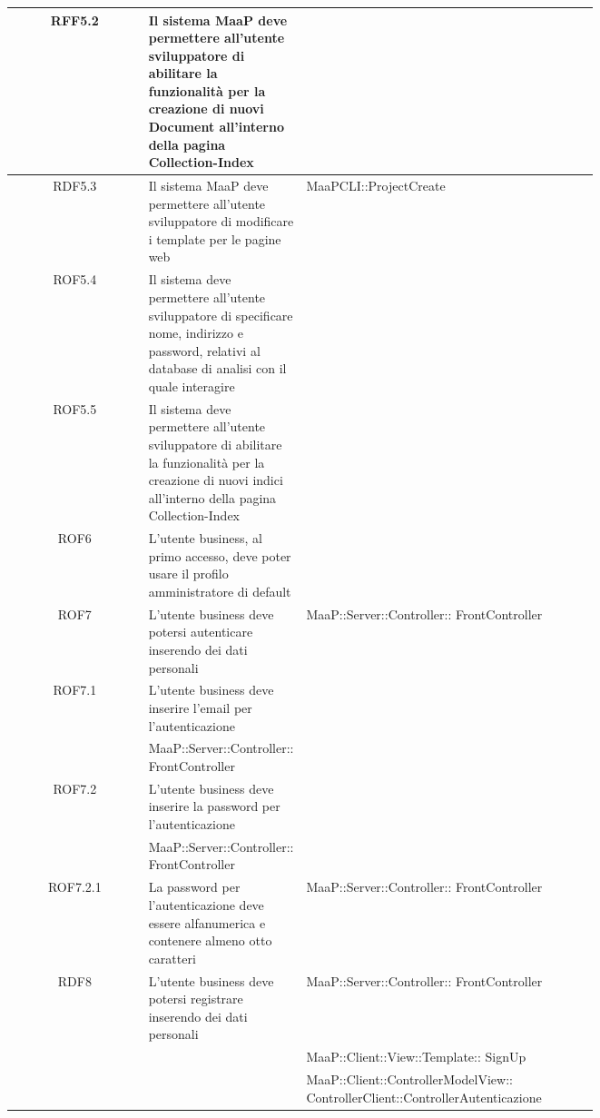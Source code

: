 \begin{center}
\begin{longtable}{|c|p{0.25\linewidth}|p{0.5\linewidth}|}
\midrule
RFF5.2
& Il sistema MaaP deve permettere all'utente sviluppatore di abilitare la funzionalità per la creazione di nuovi Document all'interno della pagina Collection-Index
& \\

\midrule
RDF5.3
& Il sistema MaaP deve permettere all'utente sviluppatore di modificare i template per le pagine web
& MaaPCLI::ProjectCreate\\

\midrule
ROF5.4
& Il sistema deve permettere all'utente sviluppatore di specificare nome, indirizzo e password, relativi al database di analisi con il quale interagire
& \\

\midrule
ROF5.5
& Il sistema deve permettere all'utente sviluppatore di abilitare la funzionalità per la creazione di nuovi indici all'interno della pagina Collection-Index
& \\



\midrule
ROF6
& L'utente business, al primo accesso, deve poter usare il profilo amministratore di default
& \\

\midrule
ROF7
& L'utente business deve potersi autenticare inserendo dei dati personali
& MaaP::Server::Controller:: FrontController\\

\midrule
ROF7.1
& L'utente business deve inserire l'email per l'autenticazione
& \\& MaaP::Server::Controller:: FrontController\\

\midrule
ROF7.2
& L'utente business deve inserire la password per l'autenticazione
& \\& MaaP::Server::Controller:: FrontController\\

\midrule
ROF7.2.1
& La password per l'autenticazione deve essere alfanumerica e contenere almeno otto caratteri
& MaaP::Server::Controller:: FrontController\\

\midrule
RDF8
& L'utente business deve potersi registrare inserendo dei dati personali
& MaaP::Server::Controller:: FrontController\\
& & MaaP::Client::View::Template:: SignUp\\
& & MaaP::Client::ControllerModelView:: ControllerClient::ControllerAutenticazione\\


\end{longtable}
\end{center}
